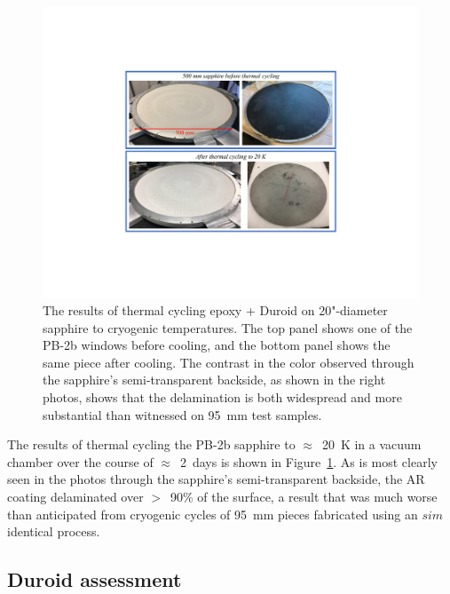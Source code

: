 \begin{figure}[!t]
    \centering
    \includegraphics[width=0.8\linewidth, trim=6cm 4.5cm 6cm 4.5cm, clip]{ARCoating/Figures/epoxy_duroid_sapphire_thermal_cycle.pdf}
    \caption[The results of thermal cycling epoxy + Duroid on 20"-diameter sapphire to cryogenic temperatures.]{The results of thermal cycling epoxy + Duroid on 20"-diameter sapphire to cryogenic temperatures. The top panel shows one of the PB-2b windows before cooling, and the bottom panel shows the same piece after cooling. The contrast in the color observed through the sapphire's semi-transparent backside, as shown in the right photos, shows that the delamination is both widespread and more substantial than witnessed on 95~mm test samples.}
    \label{fig:epoxy_duroid_full_scale_thermal_cycle}
\end{figure}

The results of thermal cycling the PB-2b sapphire to $\approx$~20~K in a vacuum chamber over the course of $\approx$~2~days is shown in Figure~\ref{fig:epoxy_duroid_full_scale_thermal_cycle}. As is most clearly seen in the photos through the sapphire's semi-transparent backside, the AR coating delaminated over $>$~90\% of the surface, a result that was much worse than anticipated from cryogenic cycles of 95~mm pieces fabricated using an $sim$identical process.


\subsection{Duroid assessment}
\label{sec:sapphire_ar_coating_epoxy_plastic_duroid_assessment}

